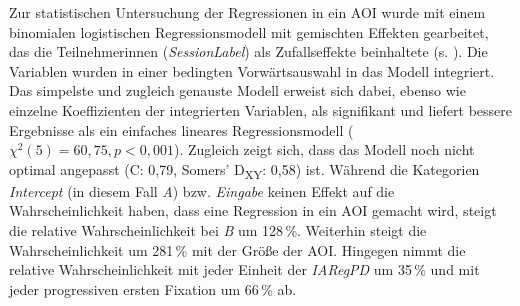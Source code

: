 Zur statistischen Untersuchung der Regressionen in ein AOI wurde mit einem binomialen logistischen Regressionsmodell mit gemischten Effekten gearbeitet, das die Teilnehmer{\textperiodcentered}innen (\emph{SessionLabel}) als Zufallseffekte beinhaltete (s. ). Die Variablen wurden in einer bedingten Vorwärtsauswahl in das Modell integriert. Das simpelste und zugleich genauste Modell erweist sich dabei, ebenso wie einzelne Koeffizienten der integrierten Variablen, als signifikant und liefert bessere Ergebnisse als ein einfaches lineares Regressionsmodell ($\chi^2(5) = 60,75, p < 0,001$). Zugleich zeigt sich, dass das Modell noch nicht optimal angepasst (C: 0,79, Somers’ D\textsubscript{XY}: 0,58) ist. Während die Kategorien \emph{Intercept} (in diesem Fall \emph{A}) bzw. \emph{Eingabe} keinen Effekt auf die Wahrscheinlichkeit haben, dass eine Regression in ein AOI gemacht wird, steigt die relative Wahrscheinlichkeit bei \emph{B} um 128\,\%. Weiterhin steigt die Wahrscheinlichkeit um 281\,\% mit der Größe der AOI. Hingegen nimmt die relative Wahrscheinlichkeit mit jeder Einheit der \emph{IARegPD} um 35\,\% und mit jeder progressiven ersten Fixation um 66\,\% ab.



